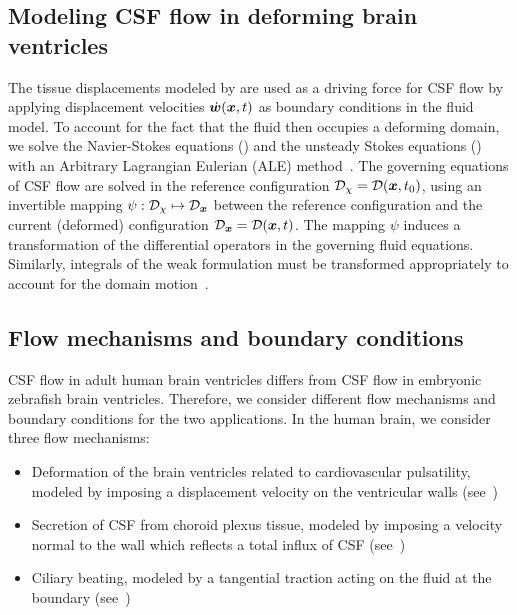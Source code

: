 \documentclass{template}
\begin{document}
\subsection{Modeling CSF flow in deforming brain ventricles}
The tissue displacements modeled by 
are used as a driving force for CSF flow by applying displacement velocities
$\dot{\bm{w}}(\bm{x}, t)$ as boundary conditions in the fluid model.
To account for the fact that the fluid then occupies a deforming domain,
we solve the Navier-Stokes equations ()
and the unsteady Stokes equations ()
with an Arbitrary Lagrangian Eulerian (ALE)
method~\citep{Duarte2004ALE,Scovazzi2007LectureNotes}.
The governing equations of CSF flow are solved in the reference configuration
$\mathcal{D}_{\chi} = \mathcal{D}(\bm{x}, t_0)$, using an invertible mapping
$\psi : \mathcal{D}_{\chi}\mapsto\mathcal{D}_{\bm{x}}$ between the reference configuration
and the current (deformed) configuration $\mathcal{D}_{\bm{x}} = \mathcal{D}(\bm{x}, t)$. 
The mapping $\psi$ induces a transformation of the differential operators
in the governing fluid equations. Similarly, integrals of the weak formulation
must be transformed appropriately to account for the
domain motion~\citep{Scovazzi2007LectureNotes}.

\subsection{Flow mechanisms and boundary conditions}
CSF flow in adult human brain ventricles differs from CSF flow in embryonic
zebrafish brain ventricles. Therefore, we consider different flow mechanisms
and boundary conditions for the two applications.
In the human brain, we consider three flow mechanisms:
\begin{itemize}
    \item Deformation of the brain ventricles related to cardiovascular pulsatility,
    modeled by imposing a displacement velocity
    on the ventricular walls (see~)
    \item Secretion of CSF from choroid plexus tissue,
    modeled by imposing a velocity normal to the wall
    which reflects a total influx of CSF (see~)
    \item Ciliary beating, modeled by a tangential traction
    acting on the fluid at the boundary (see~)
\end{itemize}
\end{document}
